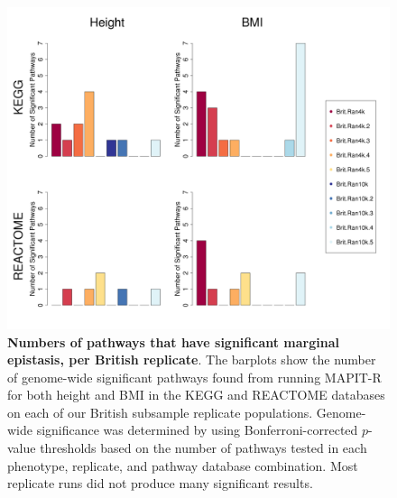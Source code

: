 \documentclass[12pt,a4paper]{article}
\begin{document}
\clearpage
\setlength{\footskip}{1cm}

\begin{figure}[htbp]
\centering
\hspace*{-1.75cm}
\includegraphics[scale=.45]{Images/Supp/InterPath_Supp_Figure_BritReps_Barplot_vs3.png}
\caption[TBD]{\textbf{Numbers of pathways that have significant marginal epistasis, per British replicate}. The barplots show the number of genome-wide significant pathways found from running MAPIT-R for both height and BMI in the KEGG and REACTOME databases on each of our British subsample replicate populations. Genome-wide significance was determined by using Bonferroni-corrected $p$-value thresholds based on the number of pathways tested in each phenotype, replicate, and pathway database combination. Most replicate runs did not produce many significant results.}
\label{InterPath-Supp-Figure-BritReps-Barplots}
\end{figure}
\clearpage
\end{document}
